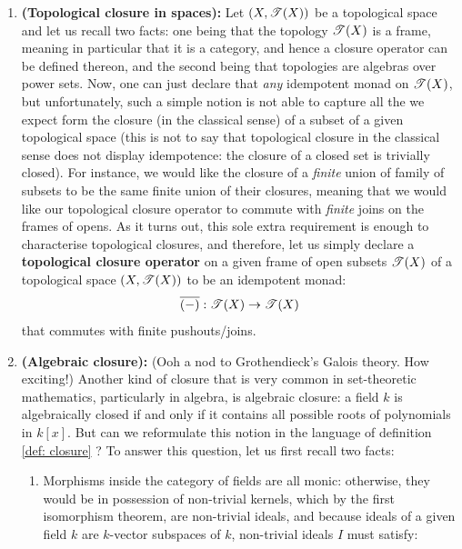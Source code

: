                     \begin{example}
                        \noindent
                        \begin{enumerate}
                            \item \textbf{(Topological closure in spaces):} Let $(X, \mathscr{T}(X))$ be a topological space and let us recall two facts: one being that the topology $\mathscr{T}(X)$ is a frame, meaning in particular that it is a category, and hence a closure operator can be defined thereon, and the second being that topologies are algebras over power sets. Now, one can just declare that \textit{any} idempotent monad on $\mathscr{T}(X)$, but unfortunately, such a simple notion is not able to capture all the we expect form the closure (in the classical sense) of a subset of a given topological space (this is not to say that topological closure in the classical sense does not display idempotence: the closure of a closed set is trivially closed). For instance, we would like the closure of a \textit{finite} union of family of subsets to be the same finite union of their closures, meaning that we would like our topological closure operator to commute with \textit{finite} joins on the frames of opens. As it turns out, this sole extra requirement is enough to characterise topological closures, and therefore, let us simply declare a \textbf{topological closure operator} on a given frame of open subsets $\mathscr{T}(X)$ of a topological space $(X, \mathscr{T}(X))$ to be an idempotent monad:
                                $$\overline{(-)}: \mathscr{T}(X) \to \mathscr{T}(X)$$
                            that commutes with finite pushouts/joins. 
                            \item \textbf{(Algebraic closure):} (Ooh a nod to Grothendieck's Galois theory. How exciting!) Another kind of closure that is very common in set-theoretic mathematics, particularly in algebra, is algebraic closure: a field $k$ is algebraically closed if and only if it contains all possible roots of polynomials in $k[x]$. But can we reformulate this notion in the language of definition \ref{def: closure} ? To answer this question, let us first recall two facts:
                                \begin{enumerate}
                                    \item Morphisms inside the category of fields are all monic: otherwise, they would be in possession of non-trivial kernels, which by the first isomorphism theorem, are non-trivial ideals, and because ideals of a given field $k$ are $k$-vector subspaces of $k$, non-trivial ideals $I$ must satisfy:

\end{enumerate}
\end{enumerate}
\end{example}
